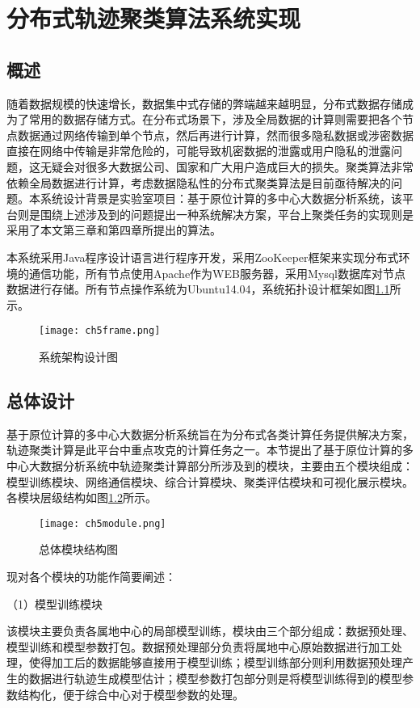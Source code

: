 \chapter{分布式轨迹聚类算法系统实现}

\section{概述}

随着数据规模的快速增长，数据集中式存储的弊端越来越明显，分布式数据存储成为了常用的数据存储方式。在分布式场景下，涉及全局数据的计算则需要把各个节点数据通过网络传输到单个节点，然后再进行计算，然而很多隐私数据或涉密数据直接在网络中传输是非常危险的，可能导致机密数据的泄露或用户隐私的泄露问题，这无疑会对很多大数据公司、国家和广大用户造成巨大的损失。聚类算法非常依赖全局数据进行计算，考虑数据隐私性的分布式聚类算法是目前亟待解决的问题。本系统设计背景是实验室项目：基于原位计算的多中心大数据分析系统，该平台则是围绕上述涉及到的问题提出一种系统解决方案，平台上聚类任务的实现则是采用了本文第三章和第四章所提出的算法。

本系统采用Java程序设计语言进行程序开发，采用ZooKeeper框架来实现分布式环境的通信功能，所有节点使用Apache作为WEB服务器，采用Mysql数据库对节点数据进行存储。所有节点操作系统为Ubuntu14.04，系统拓扑设计框架如图\ref{ch5frame}所示。
\begin{figure}[H]
	\texttt{[image: ch5frame.png]}
	\caption{系统架构设计图}
	\label{ch5frame}
\end{figure}

\section{总体设计}
基于原位计算的多中心大数据分析系统旨在为分布式各类计算任务提供解决方案，轨迹聚类计算是此平台中重点攻克的计算任务之一。本节提出了基于原位计算的多中心大数据分析系统中轨迹聚类计算部分所涉及到的模块，主要由五个模块组成：模型训练模块、网络通信模块、综合计算模块、聚类评估模块和可视化展示模块。各模块层级结构如图\ref{ch5module}所示。
\begin{figure}[H]
	\texttt{[image: ch5module.png]}
	\caption{总体模块结构图}
	\label{ch5module}
\end{figure}

现对各个模块的功能作简要阐述：

（1）模型训练模块

该模块主要负责各属地中心的局部模型训练，模块由三个部分组成：数据预处理、模型训练和模型参数打包。数据预处理部分负责将属地中心原始数据进行加工处理，使得加工后的数据能够直接用于模型训练；模型训练部分则利用数据预处理产生的数据进行轨迹生成模型估计；模型参数打包部分则是将模型训练得到的模型参数结构化，便于综合中心对于模型参数的处理。
 
